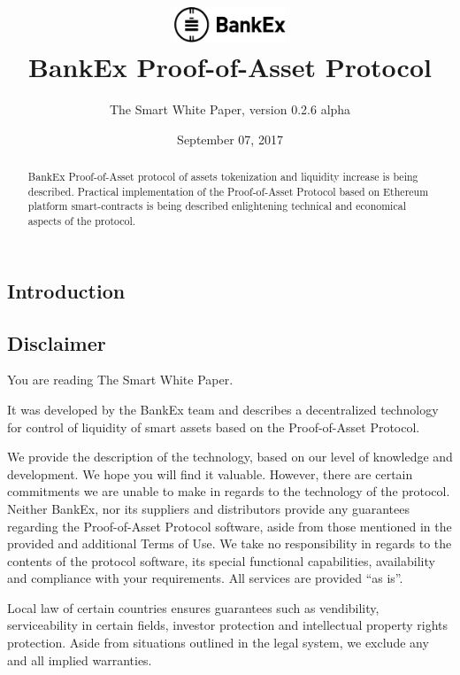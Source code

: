 \documentclass{article}
\title{\vspace{-3.85em}\includegraphics[width=0.25\textwidth]{logo.pdf} \\ \vspace{24pt} BankEx Proof-of-Asset Protocol}
\author{The Smart White Paper, version 0.2.6 alpha}
\date{September 07, 2017}
\begin{document}
\maketitle

\begin{abstract}
BankEx Proof-of-Asset protocol of assets tokenization and liquidity increase is being described. Practical implementation of the Proof-of-Asset Protocol based on Ethereum platform smart-contracts is being described enlightening technical and economical aspects of the protocol.
\end{abstract}

\vspace{24pt}

\begin{multicols}{2}

\tableofcontents

\section{Introduction}

\subsection{Disclaimer}

You are reading The Smart White Paper.

It was developed by the BankEx team and describes a decentralized technology for control of liquidity of smart assets based on the Proof-of-Asset Protocol.
	
We provide the description of the technology, based on our level of knowledge and development. We hope you will find it valuable. However, there are certain commitments we are unable to make in regards to the technology of the protocol.  
Neither BankEx, nor its suppliers and distributors provide any guarantees regarding the Proof-of-Asset Protocol software, aside from those mentioned in the provided and additional Terms of Use. We take no responsibility in regards to the contents of the protocol software, its special functional capabilities, availability and compliance with your requirements. All services are provided \enquote{as is}.

Local law of certain countries ensures guarantees such as vendibility, serviceability in certain fields, investor protection and intellectual property rights protection. Aside from situations outlined in the legal system, we exclude any and all implied warranties.


\end{multicols}
\end{document}
